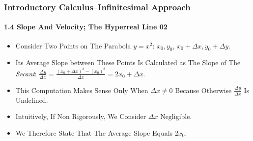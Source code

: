 \begin{frame}
\frametitle{Introductory Calculus--Infinitesimal Approach}
\framesubtitle{1.4 Slope And Velocity; The Hyperreal Line 02}
\label{slide:1.4-02}
\begin{itemize}
\item Consider Two Points \alert{on The Parabola $y=x^2$}: $x_0,y_0$, $x_0+\Delta x, y_0+\Delta y$. 
\pause\item Its \alert{Average Slope between These Points} Is Calculated as \alert{The Slope of The \textit{Secant}}: $\frac{\Delta y}{\Delta x}=\frac{(x_0+\Delta x)^2-(x_0)^2}{\Delta x}=2x_0+\Delta x$.
\pause\item This Computation Makes Sense \alert{Only When $\Delta x\ne 0$} Because \alert{Otherwise $\frac{\Delta y}{\Delta x}$ Is Undefined}.
\pause\item \alert{Intuitively, If Non Rigorously,} We \alert{Consider $\Delta x$ Negligible}.
\pause\item We Therefore State That \alert{The Average Slope Equals $2x_0$}.
\end{itemize}
\end{frame}
